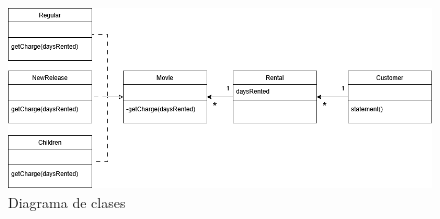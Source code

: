 

\begin{figure}[htbp]
   \centering
   \includegraphics{images/ACG_Practica2.drawio.png}
   \caption{Diagrama de clases}
   \label{fig:ACG_Practica2.drawio}
\end{figure}

